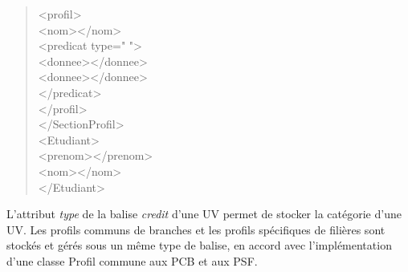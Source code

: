 \documentclass[a4paper,10pt,french]{report}
\begin{document}
\begin{quote}
	\hspace*{1cm}<profil>\\
	\hspace*{1cm}\hspace*{1cm}	<nom></nom>		\\
	\hspace*{1cm}\hspace*{1cm}	<predicat type=" "> \\
		\hspace*{1cm}\hspace*{1cm}\hspace*{1cm}	<donnee></donnee>\\
		\hspace*{1cm}\hspace*{1cm}\hspace*{1cm}	<donnee></donnee>\\
		\hspace*{1cm}\hspace*{1cm}</predicat>\\
	\hspace*{1cm}</profil>\\
</SectionProfil>\\
<Etudiant>\\
	\hspace*{1cm}<prenom></prenom>\\
	\hspace*{1cm}<nom></nom>\\
</Etudiant>\\
		\end{quote}
		
	L'attribut \emph{type} de la balise \emph{credit} d'une UV permet de stocker la catégorie d'une UV.
	Les profils communs de branches et les profils spécifiques de filières sont stockés et gérés sous un même type de balise, en accord avec l'implémentation d'une classe Profil commune aux PCB et aux PSF.
	
\end{document}
